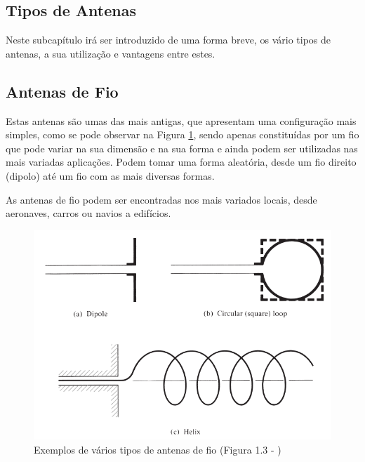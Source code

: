\subsection{Tipos de Antenas}
Neste subcapítulo irá ser introduzido de uma forma breve, os vário tipos de antenas, a sua utilização e vantagens entre estes. 

\subsection*{Antenas de Fio}
Estas antenas são umas das mais antigas, que apresentam uma configuração mais simples, como se pode observar na Figura \ref{fig:wire antenna}, sendo apenas constituídas por um fio que pode variar na sua dimensão e na sua forma e ainda podem ser utilizadas nas mais variadas aplicações. Podem tomar uma forma aleatória, desde um fio direito (dipolo) até um fio com as mais diversas formas. \par 
As antenas de fio podem ser encontradas nos mais variados locais, desde aeronaves, carros ou navios a edifícios.

\begin{figure}[h]
\centering
\includegraphics[scale=0.6]{chapters/ch3/assets/wire_antenna}
\decoRule
\caption[Antena de Fio]{Exemplos de vários tipos de antenas de fio (Figura 1.3 - \cite{Balanis2016})}
\label{fig:wire antenna}
\end{figure}

